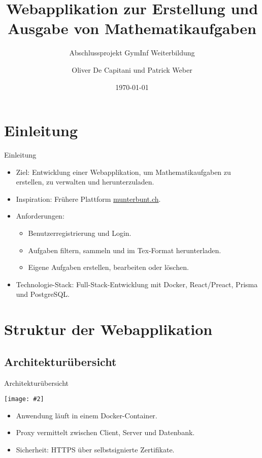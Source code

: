 \documentclass{beamer}
\title{Webapplikation zur Erstellung und Ausgabe von Mathematikaufgaben}
\subtitle{Abschlussprojekt GymInf Weiterbildung}
\author{Oliver De Capitani und Patrick Weber}
\date{\today}
\newcommand{\centfig}[2]{\begin{center}
  \texttt{[image: \#2]}
  \end{center}}
\begin{document}
\frame{\titlepage}


\section{Einleitung}
\begin{frame}{Einleitung}
    \begin{itemize}
        \item<1-> Ziel: Entwicklung einer Webapplikation, um Mathematikaufgaben zu erstellen, zu verwalten und herunterzuladen.
        \item<2-> Inspiration: Frühere Plattform \url{munterbunt.ch}.
        \item<3-> Anforderungen:
        \begin{itemize}
            \item Benutzerregistrierung und Login.
            \item Aufgaben filtern, sammeln und im Tex-Format herunterladen.
            \item Eigene Aufgaben erstellen, bearbeiten oder löschen.
        \end{itemize}
        \item<4-> Technologie-Stack: Full-Stack-Entwicklung mit Docker, React/Preact, Prisma und PostgreSQL.
    \end{itemize}
\end{frame}

\section{Struktur der Webapplikation}
\subsection{Architekturübersicht}
\begin{frame}{Architekturübersicht}
    \centfig{0.5}{docker-container.png}
    \begin{itemize}
        \item Anwendung läuft in einem Docker-Container.
        \item Proxy vermittelt zwischen Client, Server und Datenbank.
        \item Sicherheit: HTTPS über selbstsignierte Zertifikate.
    \end{itemize}
\end{frame}
\end{document}
